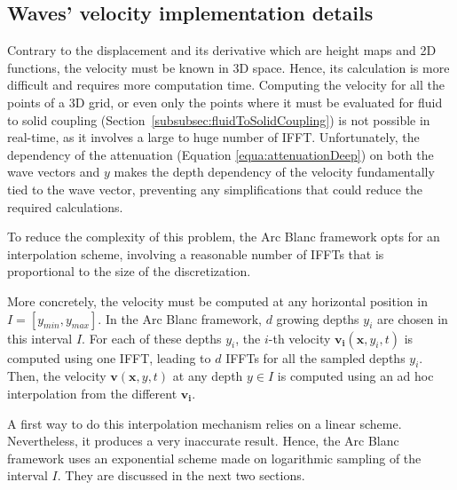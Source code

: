 \documentclass[final]{jcgt}
\def\framework{the Arc Blanc framework\xspace}
\begin{document}
\subsection{Waves' velocity implementation details}
Contrary to the displacement and its derivative which are height maps and 2D functions, the velocity must be known in 3D space.
Hence, its calculation is more difficult and requires more computation time.
Computing the velocity for all the points of a 3D grid, or even only the points where it must be evaluated for fluid to solid coupling (Section~\ref{subsubsec:fluidToSolidCoupling}) is not possible in real-time, as it involves a large to huge number of IFFT.
Unfortunately, the dependency of the attenuation (Equation \ref{equa:attenuationDeep}) on both the wave vectors and $y$ makes the depth dependency of the velocity fundamentally tied to the wave vector, preventing any simplifications that could reduce the required calculations.

To reduce the complexity of this problem, \framework opts for an interpolation scheme, involving a reasonable number of IFFTs that is proportional to the size of the discretization.

More concretely, the velocity must be computed at any horizontal position in $I=[y_{min}, y_{max}]$.
In \framework, $d$ growing depths $y_i$ are chosen in this interval $I$.
For each of these depths $y_i$, the $i$-th velocity $\mathbf{v_i}(\mathbf x,y_i,t)$ is computed using one IFFT, leading to $d$ IFFTs for all the sampled depths $y_i$.
Then, the velocity $\mathbf{v}(\mathbf x,y,t)$ at any depth $y\in I$ is computed using an ad hoc interpolation from the different $\mathbf{v_i}$.

A first way to do this interpolation mechanism relies on a linear scheme.
Nevertheless, it produces a very inaccurate result.
Hence, \framework uses an exponential scheme made on logarithmic sampling of the interval $I$.
They are discussed in the next two sections.

\end{document}
